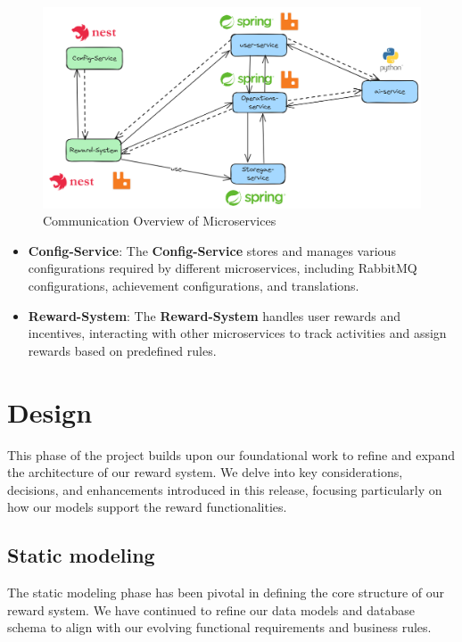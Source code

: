 \begin{figure}[h]
    \centering
    \includegraphics[width=\linewidth]{src/assets/diagrams/microservicesComm.png}
    \caption{Communication Overview of Microservices}
    \label{fig:microservices}
\end{figure}

\begin{itemize}
    \item \textbf{Config-Service}: The \textbf{Config-Service} stores and manages various configurations required by different microservices, including RabbitMQ configurations, achievement configurations, and translations.
    
    \item \textbf{Reward-System}: The \textbf{Reward-System} handles user rewards and incentives, interacting with other microservices to track activities and assign rewards based on predefined rules.
\end{itemize}

\section{Design}
This phase of the project builds upon our foundational work to refine and expand the architecture of our reward system. We delve into key considerations, decisions, and enhancements introduced in this release, focusing particularly on how our models support the reward functionalities.


\subsection{Static modeling}
The static modeling phase has been pivotal in defining the core structure of our reward system. We have continued to refine our data models and database schema to align with our evolving functional requirements and business rules.


